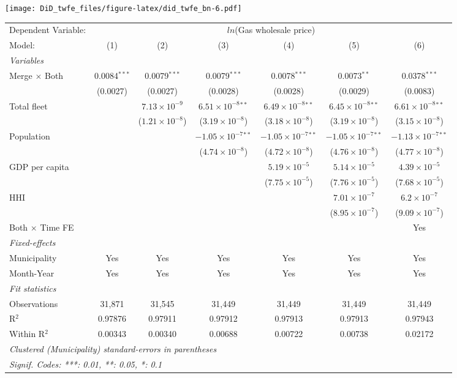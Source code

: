 \documentclass[
]{article}
\begin{document}
\texttt{[image: DiD\_twfe\_files/figure-latex/did\_twfe\_bn-6.pdf]}

\begin{tabular}{lcccccc}
\tabularnewline\midrule\midrule
Dependent Variable:&\multicolumn{6}{c}{$ln$(Gas wholesale price)}\\
Model:&(1) & (2) & (3) & (4) & (5) & (6)\\
\midrule \emph{Variables}&   &   &   &   &   &  \\
Merge $\times $ Both & 0.0084$^{***}$ & 0.0079$^{***}$ & 0.0079$^{***}$ & 0.0078$^{***}$ & 0.0073$^{**}$ & 0.0378$^{***}$\\
  &(0.0027) & (0.0027) & (0.0028) & (0.0028) & (0.0029) & (0.0083)\\
Total fleet &    & $7.13\times 10^{-9}$ & $6.51\times 10^{-8}$$^{**}$ & $6.49\times 10^{-8}$$^{**}$ & $6.45\times 10^{-8}$$^{**}$ & $6.61\times 10^{-8}$$^{**}$\\
  &   & ($1.21\times 10^{-8}$) & ($3.19\times 10^{-8}$) & ($3.18\times 10^{-8}$) & ($3.19\times 10^{-8}$) & ($3.15\times 10^{-8}$)\\
Population &    &    & $-1.05\times 10^{-7}$$^{**}$ & $-1.05\times 10^{-7}$$^{**}$ & $-1.05\times 10^{-7}$$^{**}$ & $-1.13\times 10^{-7}$$^{**}$\\
  &   &    & ($4.74\times 10^{-8}$) & ($4.72\times 10^{-8}$) & ($4.76\times 10^{-8}$) & ($4.77\times 10^{-8}$)\\
GDP per capita &    &    &    & $5.19\times 10^{-5}$ & $5.14\times 10^{-5}$ & $4.39\times 10^{-5}$\\
  &   &    &    & ($7.75\times 10^{-5}$) & ($7.76\times 10^{-5}$) & ($7.68\times 10^{-5}$)\\
HHI &    &    &    &    & $7.01\times 10^{-7}$ & $6.2\times 10^{-7}$\\
  &   &    &    &    & ($8.95\times 10^{-7}$) & ($9.09\times 10^{-7}$)\\
Both $\times$ Time FE &  &  &  &  &  & Yes\\
\midrule \emph{Fixed-effects}&   &   &   &   &   &  \\
Municipality & Yes & Yes & Yes & Yes & Yes & Yes\\
Month-Year & Yes & Yes & Yes & Yes & Yes & Yes\\
\midrule \emph{Fit statistics}&  & & & & & \\
Observations & 31,871&31,545&31,449&31,449&31,449&31,449\\
R$^2$ & 0.97876&0.97911&0.97912&0.97913&0.97913&0.97943\\
Within R$^2$ & 0.00343&0.00340&0.00688&0.00722&0.00738&0.02172\\
\midrule\midrule\multicolumn{7}{l}{\emph{Clustered (Municipality) standard-errors in parentheses}}\\
\multicolumn{7}{l}{\emph{Signif. Codes: ***: 0.01, **: 0.05, *: 0.1}}\\
\end{tabular}
\end{document}
